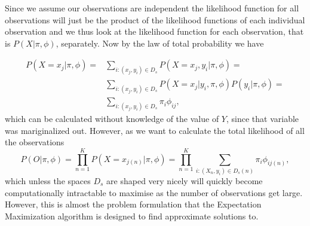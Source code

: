 Since we assume our observations are independent the likelihood function for all observations will just be the product of the likelihood functions of each individual observation and we thus look at the likelihood function for each observation, that is $P(X | \pi, \phi)$, separately. Now by the law of total probability we have 

\begin{equation*}
\begin{split}
P(X=x_j | \pi, \phi) = &\sum_{i:(x_j,y_i)\in D_s}P(X=x_j,y_i | \pi, \phi) = \\
&\sum_{i:(x_j,y_i)\in D_s} P(X=x_j|y_i , \pi, \phi)P(y_i | \pi, \phi) = \\
&\sum_{i:(x_j,y_i)\in D_s}\pi_i\phi_{ij},
\end{split}
\end{equation*}
which can be calculated without knowledge of the value of $Y$, since that variable was mariginalized out. However, as we want to calculate the total likelihood of all the observations 
\begin{equation*}
P(O | \pi, \phi) = \prod_{n=1}^K P(X=x_{j(n)} |\pi, \phi) = \prod_{n=1}^K \sum_{i:(X_n,y_i)\in D_s(n)} \pi_i\phi_{ij(n)},
\end{equation*}
which unless the spaces $D_s$ are shaped very nicely will quickly become computationally intractable to maximise as the number of observations get large. However, this is almost the problem formulation that the Expectation Maximization algorithm is designed to find approximate solutions to.

